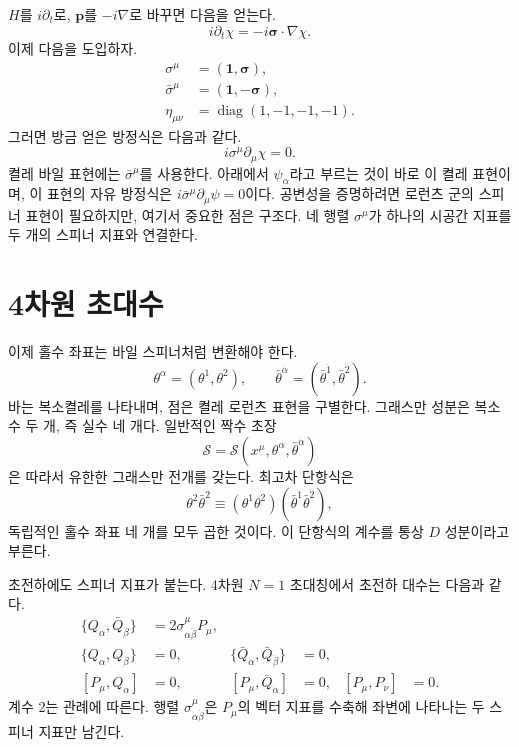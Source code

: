 \(H\)를 \(i\partial_t\)로, \(\mathbf p\)를 \(-i\nabla\)로 바꾸면 다음을 얻는다.
\begin{equation}
i\partial_t\chi=-i\boldsymbol{\sigma}\cdot\nabla\chi.
\end{equation}
이제 다음을 도입하자.
\begin{equation}
\begin{aligned}
\sigma^\mu&=(\mathbf 1,\boldsymbol{\sigma}),\\
\bar\sigma^\mu&=(\mathbf 1,-\boldsymbol{\sigma}),\\
\eta_{\mu\nu}&=\operatorname{diag}(1,-1,-1,-1).
\end{aligned}
\label{eq:l8-sigma-convention}
\end{equation}
그러면 방금 얻은 방정식은 다음과 같다.
\begin{equation}
i\sigma^\mu\partial_\mu\chi=0.
\label{eq:l8-weyl-equation}
\end{equation}
켤레 바일 표현에는 \(\bar\sigma^\mu\)를 사용한다. 아래에서 \(\psi_\alpha\)라고 부르는 것이 바로 이 켤레 표현이며, 이 표현의 자유 방정식은 \(i\bar\sigma^\mu\partial_\mu\psi=0\)이다. 공변성을 증명하려면 로런츠 군의 스피너 표현이 필요하지만, 여기서 중요한 점은 구조다. 네 행렬 \(\sigma^\mu\)가 하나의 시공간 지표를 두 개의 스피너 지표와 연결한다.

\section{4차원 초대수}

이제 홀수 좌표는 바일 스피너처럼 변환해야 한다.
\begin{equation}
\theta^\alpha=(\theta^1,\theta^2),
\qquad
\bar\theta^{\dot\alpha}=(\bar\theta^{\dot1},\bar\theta^{\dot2}).
\end{equation}
바는 복소켤레를 나타내며, 점은 켤레 로런츠 표현을 구별한다. 그래스만 성분은 복소수 두 개, 즉 실수 네 개다. 일반적인 짝수 초장
\begin{equation}
\mathcal S=\mathcal S(x^\mu,\theta^\alpha,\bar\theta^{\dot\alpha})
\end{equation}
은 따라서 유한한 그래스만 전개를 갖는다. 최고차 단항식은
\begin{equation}
\theta^2\bar\theta^2
\equiv
(\theta^1\theta^2)(\bar\theta^{\dot1}\bar\theta^{\dot2}),
\end{equation}
독립적인 홀수 좌표 네 개를 모두 곱한 것이다. 이 단항식의 계수를 통상 \(D\) 성분이라고 부른다.

초전하에도 스피너 지표가 붙는다. 4차원 \(N=1\) 초대칭에서 초전하 대수는 다음과 같다.
\begin{align}
\{Q_\alpha,\bar Q_{\dot\beta}\}
&=2\sigma^\mu_{\alpha\dot\beta}P_\mu,
\label{eq:l8-superalgebra-main}\\
\{Q_\alpha,Q_\beta\}&=0,
&
\{\bar Q_{\dot\alpha},\bar Q_{\dot\beta}\}&=0,
\label{eq:l8-superalgebra-nilpotent}\\
[P_\mu,Q_\alpha]&=0,
&
[P_\mu,\bar Q_{\dot\alpha}]&=0,
&
[P_\mu,P_\nu]&=0.
\label{eq:l8-superalgebra-commutators}
\end{align}
계수 2는 관례에 따른다. 행렬
\(\sigma^\mu_{\alpha\dot\beta}\)은 \(P_\mu\)의 벡터 지표를 수축해 좌변에 나타나는 두 스피너 지표만 남긴다.

